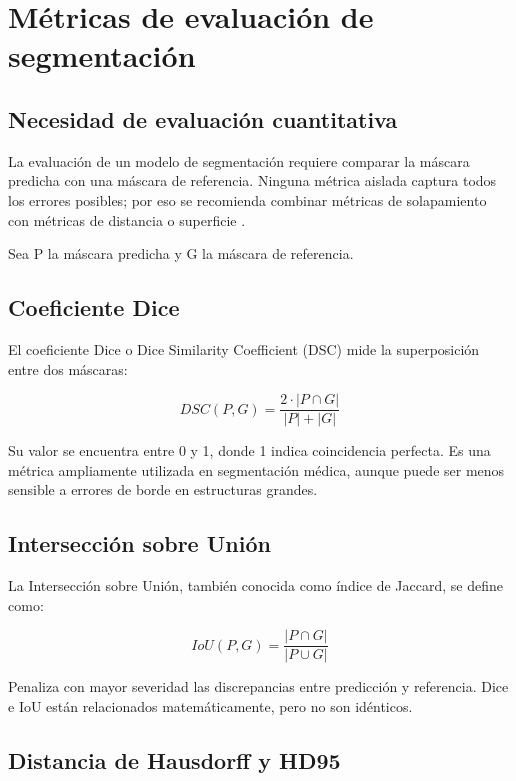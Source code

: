 \section{Métricas de evaluación de segmentación}

\subsection{Necesidad de evaluación cuantitativa}

La evaluación de un modelo de segmentación requiere comparar la máscara predicha con una máscara de referencia. Ninguna métrica aislada captura todos los errores posibles; por eso se recomienda combinar métricas de solapamiento con métricas de distancia o superficie \parencite{taha_metrics_2015,maierhein_metrics_reloaded_2024}.

Sea P la máscara predicha y G la máscara de referencia.

\subsection{Coeficiente Dice}

El coeficiente Dice o Dice Similarity Coefficient (DSC) mide la superposición entre dos máscaras:

\begin{equation}
DSC(P, G) = \frac{2 \cdot |P \cap G|}{|P| + |G|}
\end{equation}

Su valor se encuentra entre 0 y 1, donde 1 indica coincidencia perfecta. Es una métrica ampliamente utilizada en segmentación médica, aunque puede ser menos sensible a errores de borde en estructuras grandes.

\subsection{Intersección sobre Unión}

La Intersección sobre Unión, también conocida como índice de Jaccard, se define como:

\begin{equation}
IoU(P, G) = \frac{|P \cap G|}{|P \cup G|}
\end{equation}

Penaliza con mayor severidad las discrepancias entre predicción y referencia. Dice e IoU están relacionados matemáticamente, pero no son idénticos.

\subsection{Distancia de Hausdorff y HD95}

